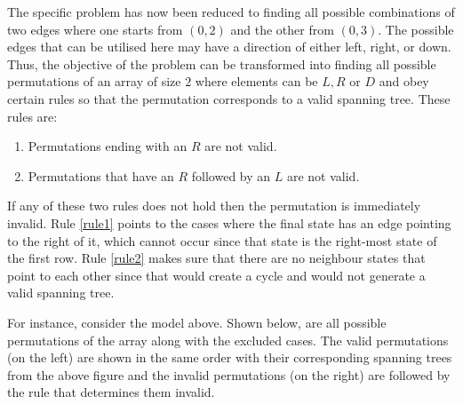 \begin{figure}[h]
    \centering
\end{figure}

The specific problem has now been reduced to finding all possible combinations 
of two edges where one starts from \((0,2)\) and the other from \((0,3)\). 
The possible edges that can be utilised here may have a direction of either 
left, right, or down. 
Thus, the objective of the problem can be transformed into finding all possible 
permutations of an array of size \(2\) where elements can be \(L, R \text{ or } D\)
and obey certain rules so that the permutation corresponds to a valid spanning 
 tree. 
 These rules are:

\begin{enumerate}
    \item Permutations ending with an \(R\) are not valid. \label{rule1}
    \item Permutations that have an \(R\) followed by an \(L\) are not valid. \label{rule2}
\end{enumerate}

If any of these two rules does not hold then the permutation is immediately invalid. 
Rule \ref{rule1} points to the cases where the final state has an edge pointing 
to the right of it, which cannot occur since that state is the right-most state 
of the first row. 
Rule \ref{rule2} makes sure that there are no neighbour states that point to 
each other since that would create a cycle and would not generate a valid 
spanning tree.

For instance, consider the model above. 
Shown below, are all possible permutations of the array along with the excluded 
cases. 
The valid permutations (on the left) are shown in the same order with their 
corresponding spanning trees from the above figure and the invalid permutations 
(on the right) are followed by the rule that determines them invalid.

